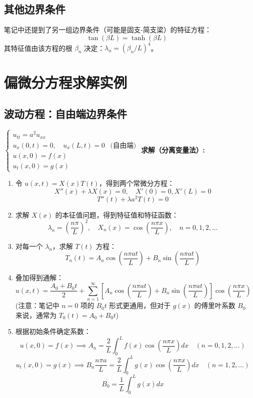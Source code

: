 \documentclass{article}
\begin{document}
	\subsection{其他边界条件}
	笔记中还提到了另一组边界条件（可能是固支-简支梁）的特征方程：
	$$
	\tan(\beta L) = \tanh(\beta L)
	$$
	其特征值由该方程的根 $\beta_n$ 决定：$\lambda_n = (\beta_n/L)^4$。
	
	\section{偏微分方程求解实例}
	
	\subsection{波动方程：自由端边界条件}
	$\begin{cases}
		u_{tt} = a^2 u_{xx} \\
		u_x(0,t) = 0, \quad u_x(L,t) = 0 & \text{(自由端)} \\
		u(x,0) = f(x) \\
		u_t(x,0) = g(x)
	\end{cases}$
	\textbf{求解（分离变量法）:}
	\begin{enumerate}
		\item 令 $u(x,t) = X(x)T(t)$，得到两个常微分方程：
		$$
		X''(x) + \lambda X(x) = 0, \quad X'(0)=0, X'(L)=0
		$$
		$$
		T''(t) + \lambda a^2 T(t) = 0
		$$
		\item 求解 $X(x)$ 的本征值问题，得到特征值和特征函数：
		$$
		\lambda_n = \left(\frac{n\pi}{L}\right)^2, \quad X_n(x) = \cos\left(\frac{n\pi x}{L}\right), \quad n=0, 1, 2, \dots
		$$
		\item 对每一个 $\lambda_n$，求解 $T(t)$ 方程：
		$$
		T_n(t) = A_n \cos\left(\frac{n\pi a t}{L}\right) + B_n \sin\left(\frac{n\pi a t}{L}\right)
		$$
		\item 叠加得到通解：
		$$
		u(x,t) = \frac{A_0 + B_0 t}{2} + \sum_{n=1}^\infty \left[A_n \cos\left(\frac{n\pi a t}{L}\right) + B_n \sin\left(\frac{n\pi a t}{L}\right)\right] \cos\left(\frac{n\pi x}{L}\right)
		$$
		(注意：笔记中 $n=0$ 项的 $B_0 t$ 形式更通用，但对于 $g(x)$ 的傅里叶系数 $B_0$ 来说，通常为 $T_0(t)=A_0+B_0t$)
		\item 根据初始条件确定系数：
		$$
		u(x,0) = f(x) \implies A_n = \frac{2}{L}\int_0^L f(x) \cos\left(\frac{n\pi x}{L}\right) dx \quad (n=0, 1, 2, \dots)
		$$
		$$
		u_t(x,0) = g(x) \implies B_n \frac{n\pi a}{L} = \frac{2}{L}\int_0^L g(x) \cos\left(\frac{n\pi x}{L}\right) dx \quad (n=1, 2, \dots)
		$$
		$$
		B_0 = \frac{1}{L}\int_0^L g(x) dx
		$$
	\end{enumerate}
	
\end{document}
